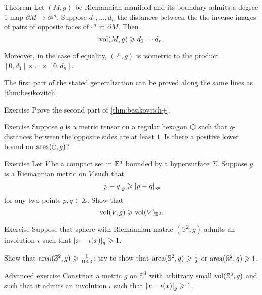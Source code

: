 \begin{thm}{Theorem}\label{thm:besikovitch+}
Let $(M,g)$ be Riemannian manifold and its boundary admits a degree 1 map $\partial M\to\partial\square^n$. 
Suppose $d_1,\dots, d_n$ the distances between the the inverse images of pairs of opposite faces of $\square^n$ in $\partial M$.
Then 
\[\operatorname{\rm vol}\nolimits(M,g)\geqslant d_1\cdots d_n.\]

Moreover, in the case of equality, $(\square^n,g)$ is isometric to the product $[0,d_1]\times\dots\times[0,d_n]$.
\end{thm}

The first part of the stated generalization can be proved along the same lines as \ref{thm:besikovitch}.

\begin{thm}{Exercise}\label{ex:besikovitch=}
Prove the second part of \ref{thm:besikovitch+}.
\end{thm}

\begin{thm}{Exercise}\label{ex:hexagon}
Suppose $g$ is a metric tensor on a regular hexagon $\varhexagon
   $ such that $g$-distances between the opposite sides are at least $1$.
Is there a positive lower bound on $\area(\varhexagon,g)$?
\end{thm}

\begin{thm}{Exercise}\label{ex:gadograph}
Let $V$ be a compact set in $\mathbb{E}^d$ bounded by a hypersurface $\Sigma$.
Suppose $g$ is a Riemannian metric on $V$ such that 
\[\dist{p}{q}{g}\ge\dist{p}{q}{\EE^d}\]
for any two points $p,q\in \Sigma$.
Show that
\[\operatorname{\rm vol}\nolimits(V,g)\geqslant \operatorname{\rm vol}\nolimits(V)_{\mathbb{E}^d}.\]
 
\end{thm}

\begin{thm}{Exercise}\label{ex:involution-of-sphere}
Suppose that sphere with Riemannian matric $(\mathbb{S}^2,g)$ admits an involution $\iota$ such that $\dist{x}{\iota(x)}{g}\ge 1$.

Show that $\operatorname{\rm area}\nolimits(\mathbb{S}^2,g)\geqslant \tfrac1{1000}$;
try to show that $\operatorname{\rm area}\nolimits(\mathbb{S}^2,g)\geqslant \tfrac12$ or $\operatorname{\rm area}\nolimits(\mathbb{S}^2,g)\geqslant 1$.
\end{thm}

\begin{thm}{Advanced exercise}\label{ex:involution-of-3sphere}
Construct a metric $g$ on $\mathbb{S}^3$ with arbitrary small $\operatorname{\rm vol}\nolimits(\mathbb{S}^3,g)$ and such that it admits an involution $\iota$ such that $\dist{x}{\iota(x)}{g}\ge 1$.
\end{thm}

